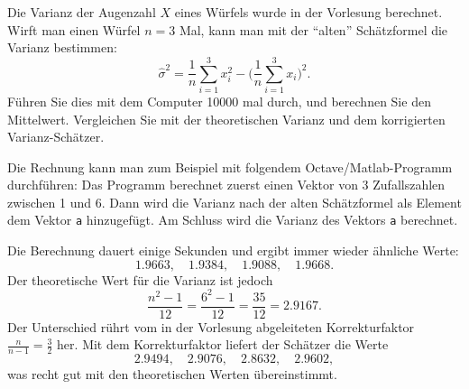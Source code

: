 Die Varianz der Augenzahl $X$ eines Würfels wurde in der Vorlesung
berechnet. Wirft man einen Würfel $n=3$ Mal, kann man mit der
``alten'' Schätzformel die Varianz bestimmen:
\[
\hat\sigma^2=\frac1n\sum_{i=1}^3x_i^2-\biggl(\frac1n\sum_{i=1}^3x_i\biggr)^2.
\]
Führen Sie dies mit dem Computer 10000 mal durch, und berechnen Sie den
Mittelwert. Vergleichen Sie mit der theoretischen Varianz und dem
korrigierten Varianz-Schätzer.

\begin{loesung}
Die Rechnung kann man zum Beispiel mit folgendem Octave/Matlab-Programm
durchführen:
Das Programm berechnet zuerst einen Vektor von 3 Zufallszahlen zwischen 1
und 6. Dann wird die Varianz nach der alten Schätzformel als Element
dem Vektor {\tt a} hinzugefügt. Am Schluss wird die Varianz des Vektors
{\tt a} berechnet.

Die Berechnung dauert einige Sekunden und ergibt immer wieder
ähnliche Werte:
\[
1.9663,\quad 
1.9384,\quad
1.9088,\quad
1.9668.
\]
Der theoretische Wert für die Varianz ist jedoch
\[
\frac{n^2-1}{12}=\frac{6^2-1}{12}=\frac{35}{12}=2.9167.
\]
Der Unterschied rührt vom in der Vorlesung abgeleiteten Korrekturfaktor
$\frac{n}{n-1}=\frac32$ her. Mit dem Korrekturfaktor liefert der Schätzer die
Werte
\[
2.9494,\quad 
2.9076,\quad
2.8632,\quad
2.9602,
\]
was recht gut mit den theoretischen Werten übereinstimmt.
\end{loesung}

